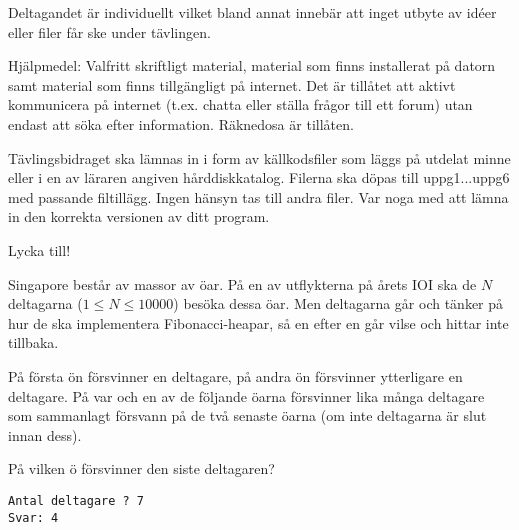 \begin{lista}
\item Deltagandet är individuellt vilket bland annat innebär att inget utbyte av idéer eller 
filer får ske under tävlingen.  
\item Hjälpmedel: Valfritt skriftligt material, material som finns installerat på datorn samt material som finns tillgängligt på internet. Det är  tillåtet att aktivt kommunicera på internet (t.ex. chatta eller ställa frågor till ett forum) utan endast att söka efter information. Räknedosa är tillåten.
\item Tävlingsbidraget ska lämnas in i form av källkodsfiler som läggs på utdelat 
minne eller i en av läraren angiven hårddiskkatalog. Filerna ska döpas till 
uppg1...uppg6 med passande filtillägg. Ingen hänsyn tas till andra filer. Var noga 
med att lämna in den korrekta versionen av ditt program.  
\end{lista}

\begin{center}
\Large Lycka till!
\end{center}
%

\newpage





Singapore består av massor av öar. På en av utflykterna på årets IOI ska de $N$ deltagarna ($1\le N \le 10000$) besöka dessa öar. Men deltagarna går och tänker på hur de ska implementera Fibonacci-heapar, så en efter en går vilse och hittar inte tillbaka.

På första ön försvinner en deltagare, på andra ön försvinner ytterligare en deltagare. På var och en av de följande öarna försvinner lika många deltagare som sammanlagt försvann på de två senaste öarna (om inte deltagarna är slut innan dess).

På vilken ö försvinner den siste deltagaren?


\begin{verbatim}
Antal deltagare ? 7
Svar: 4
\end{verbatim}


